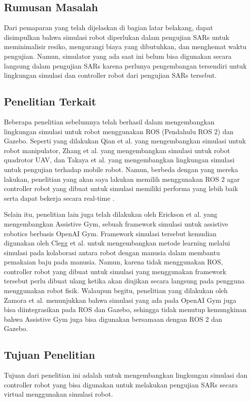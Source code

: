 \subsection{Rumusan Masalah}

Dari pemaparan yang telah dijelaskan di bagian latar belakang, dapat disimpulkan bahwa simulasi robot diperlukan dalam pengujian SARs untuk meminimalisir resiko, mengurangi biaya yang dibutuhkan, dan menghemat waktu pengujian.
Namun, simulator yang ada saat ini belum bisa digunakan secara langsung dalam pengujian SARs karena perlunya pengembangan tersendiri untuk lingkungan simulasi dan controller robot dari pengujian SARs tersebut.

\subsection{Penelitian Terkait}

Beberapa penelitian sebelumnya telah berhasil dalam mengembangkan lingkungan simulasi untuk robot menggunakan ROS (Pendahulu ROS 2) dan Gazebo.
Seperti yang dilakukan Qian et al. \citep{Qian2014} yang mengembangkan simulasi untuk robot manipulator, Zhang et al. \citep{Zhang2015} yang mengembangkan simulasi untuk robot quadrotor UAV, dan Takaya et al. \citep{Takaya2016} yang mengembangkan lingkungan simulasi untuk pengujian terhadap mobile robot.
Namun, berbeda dengan yang mereka lakukan, penelitian yang akan saya lakukan memilih menggunakan ROS 2 agar controller robot yang dibuat untuk simulasi memiliki performa yang lebih baik serta dapat bekerja secara real-time \citep{Maruyama2016}.

Selain itu, penelitian lain juga telah dilakukan oleh Erickson et al. \citep{Erickson2020} yang mengembangkan Assistive Gym, sebuah framework simulasi untuk assistive robotics berbasis OpenAI Gym.
Framework simulasi tersebut kemudian digunakan oleh Clegg et al. \citep{Clegg2020} untuk mengembangkan metode learning melalui simulasi pada kolaborasi antara robot dengan manusia dalam membantu pemakaian baju pada manusia.
Namun, karena tidak menggunakan ROS, controller robot yang dibuat untuk simulasi yang menggunakan framework tersebut perlu dibuat ulang ketika akan diujikan secara langsung pada pengguna menggunakan robot fisik.
Walaupun begitu, penelitian yang dilakukan oleh Zamora et al. \citep{Zamora2016} menunjukkan bahwa simulasi yang ada pada OpenAI Gym juga bisa diintegrasikan pada ROS dan Gazebo, sehingga tidak menutup kemungkinan bahwa Assistive Gym juga bisa digunakan bersamaan dengan ROS 2 dan Gazebo.

\subsection{Tujuan Penelitian}

Tujuan dari penelitian ini adalah untuk mengembangkan lingkungan simulasi dan controller robot yang bisa digunakan untuk melakukan pengujian SARs secara virtual menggunakan simulasi robot.
